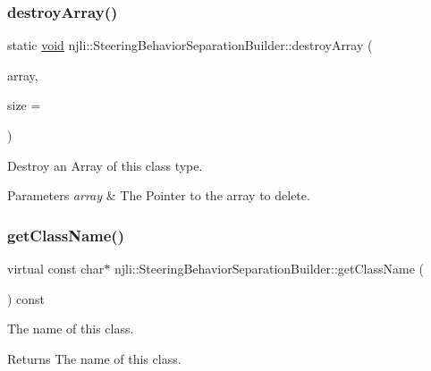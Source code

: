 \subsubsection{\texorpdfstring{destroy\+Array()}{destroyArray()}}
{\footnotesize\ttfamily static \mbox{\hyperlink{_thread_8h_af1e856da2e658414cb2456cb6f7ebc66}{void}} njli\+::\+Steering\+Behavior\+Separation\+Builder\+::destroy\+Array (\begin{DoxyParamCaption}\item[{\mbox{\hyperlink{classnjli_1_1_steering_behavior_separation_builder}{Steering\+Behavior\+Separation\+Builder}} $\ast$$\ast$}]{array,  }\item[{const \mbox{\hyperlink{_util_8h_a10e94b422ef0c20dcdec20d31a1f5049}{u32}}}]{size = {} }\end{DoxyParamCaption})\hspace{0.3cm}{\ttfamily [static]}}

Destroy an Array of this class type.


\begin{DoxyParams}{Parameters}
{\em array} & The Pointer to the array to delete. \\
\hline
\end{DoxyParams}
\mbox{\label{classnjli_1_1_steering_behavior_separation_builder_ad48a83519ff8f327eb065e1eb8394a6d}} 
\subsubsection{\texorpdfstring{get\+Class\+Name()}{getClassName()}}
{\footnotesize\ttfamily virtual const char$\ast$ njli\+::\+Steering\+Behavior\+Separation\+Builder\+::get\+Class\+Name (\begin{DoxyParamCaption}{ }\end{DoxyParamCaption}) const\hspace{0.3cm}{\ttfamily [virtual]}}

The name of this class.

\begin{DoxyReturn}{Returns}
The name of this class. 
\end{DoxyReturn}


